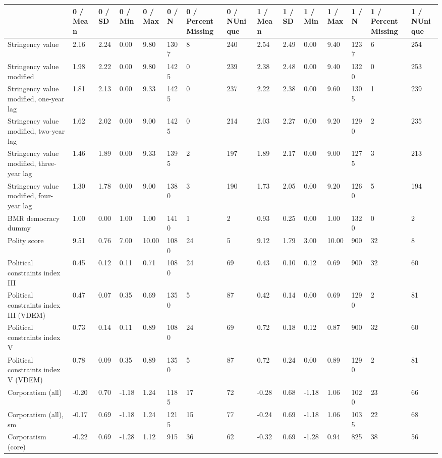
\begin{longtable}{lllllllllllllll}
\toprule
  & 0 / Mean & 0 / SD & 0 / Min & 0 / Max & 0 / N & 0 / PercentMissing & 0 / NUnique & 1 / Mean & 1 / SD & 1 / Min & 1 / Max & 1 / N & 1 / PercentMissing & 1 / NUnique\\
\midrule
Stringency value & 2.16 & 2.24 & 0.00 & 9.80 & 1307 & 8 & 240 & 2.54 & 2.49 & 0.00 & 9.40 & 1237 & 6 & 254\\
Stringency value modified & 1.98 & 2.22 & 0.00 & 9.80 & 1425 & 0 & 239 & 2.38 & 2.48 & 0.00 & 9.40 & 1320 & 0 & 253\\
Stringency value modified, one-year lag & 1.81 & 2.13 & 0.00 & 9.33 & 1425 & 0 & 237 & 2.22 & 2.38 & 0.00 & 9.60 & 1305 & 1 & 239\\
Stringency value modified, two-year lag & 1.62 & 2.02 & 0.00 & 9.00 & 1425 & 0 & 214 & 2.03 & 2.27 & 0.00 & 9.20 & 1290 & 2 & 235\\
Stringency value modified, three-year lag & 1.46 & 1.89 & 0.00 & 9.33 & 1395 & 2 & 197 & 1.89 & 2.17 & 0.00 & 9.00 & 1275 & 3 & 213\\
\addlinespace
Stringency value modified, four-year lag & 1.30 & 1.78 & 0.00 & 9.00 & 1380 & 3 & 190 & 1.73 & 2.05 & 0.00 & 9.20 & 1260 & 5 & 194\\
BMR democracy dummy & 1.00 & 0.00 & 1.00 & 1.00 & 1410 & 1 & 2 & 0.93 & 0.25 & 0.00 & 1.00 & 1320 & 0 & 2\\
Polity score & 9.51 & 0.76 & 7.00 & 10.00 & 1080 & 24 & 5 & 9.12 & 1.79 & 3.00 & 10.00 & 900 & 32 & 8\\
Political constraints index III & 0.45 & 0.12 & 0.11 & 0.71 & 1080 & 24 & 69 & 0.43 & 0.10 & 0.12 & 0.69 & 900 & 32 & 60\\
Political constraints index III (VDEM) & 0.47 & 0.07 & 0.35 & 0.69 & 1350 & 5 & 87 & 0.42 & 0.14 & 0.00 & 0.69 & 1290 & 2 & 81\\
\addlinespace
Political constraints index V & 0.73 & 0.14 & 0.11 & 0.89 & 1080 & 24 & 69 & 0.72 & 0.18 & 0.12 & 0.87 & 900 & 32 & 60\\
Political constraints index V (VDEM) & 0.78 & 0.09 & 0.35 & 0.89 & 1350 & 5 & 87 & 0.72 & 0.24 & 0.00 & 0.89 & 1290 & 2 & 81\\
Corporatism (all) & -0.20 & 0.70 & -1.18 & 1.24 & 1185 & 17 & 72 & -0.28 & 0.68 & -1.18 & 1.06 & 1020 & 23 & 66\\
Corporatism (all), sm & -0.17 & 0.69 & -1.18 & 1.24 & 1215 & 15 & 77 & -0.24 & 0.69 & -1.18 & 1.06 & 1035 & 22 & 68\\
Corporatism (core) & -0.22 & 0.69 & -1.28 & 1.12 & 915 & 36 & 62 & -0.32 & 0.69 & -1.28 & 0.94 & 825 & 38 & 56\\

\end{longtable}
